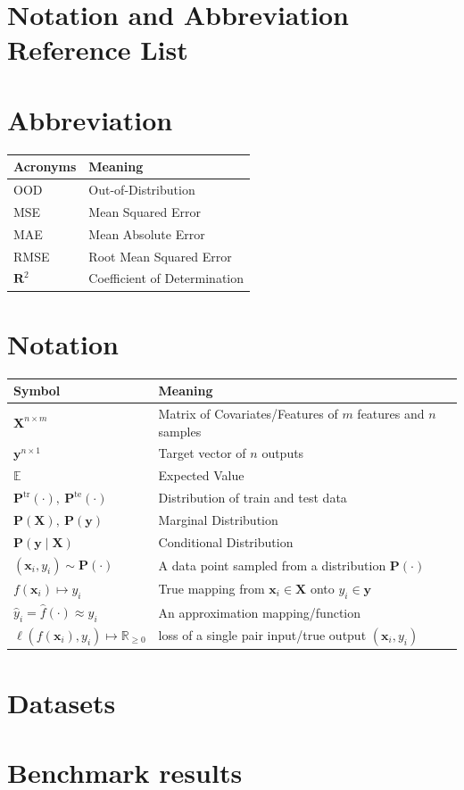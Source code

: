 \documentclass[12pt,a4paper]{article}
\theoremstyle{definition}
\theoremstyle{remark}
\begin{document}
\section{Notation and Abbreviation Reference List}

{\renewcommand{\arraystretch}{1.3}
\section*{Abbreviation}
\begin{tabularx}{\textwidth}{lX}
\hline
\textbf{Acronyms} & \textbf{Meaning} \\
\hline
OOD & Out-of-Distribution \\
MSE & Mean Squared Error \\
MAE & Mean Absolute Error \\
RMSE & Root Mean Squared Error \\
$\mathbf R^2$ & Coefficient of Determination \\

\hline
\end{tabularx}}

{\renewcommand{\arraystretch}{1.7}
\section*{Notation}

\begin{tabularx}{\textwidth}{lX}
\hline
\textbf{Symbol} & \textbf{Meaning} \\
\hline
$\mathbf X^{n \times m}$ & Matrix of Covariates/Features of $m$ features and $n$ samples\\
$\mathbf y^{n \times 1}$ & Target vector of $n$ outputs\\
$\mathbb E$ & Expected Value \\
$\mathbf P^{\text{tr}}(\cdot), \ \mathbf P^{\text{te}}(\cdot)$ & Distribution of train and test data \\
$\mathbf P(\mathbf X), \ \mathbf P(\mathbf y)$ & Marginal Distribution \\
$\mathbf P(\mathbf y \mid \mathbf X)$ & Conditional Distribution \\
$(\mathbf x_i, y_i) \sim \mathbf P(\cdot)$ & A data point sampled from a distribution $\mathbf P(\cdot)$ \\
$f(\mathbf x_i) \mapsto y_i$ & True mapping from $\mathbf x_i \in \mathbf X$ onto $y_i \in \mathbf y$ \\
$\hat y_i = \hat f(\cdot) \approx y_i$ & An approximation mapping/function \\
$\ell (f(\mathbf x_i), y_i) \mapsto \mathbb R_{\ge 0}$ & loss of a single pair input/true output $(\mathbf x_i, y_i)$ \\
\hline
\end{tabularx}}

\section{Datasets}


\section{Benchmark results}
\end{document}
